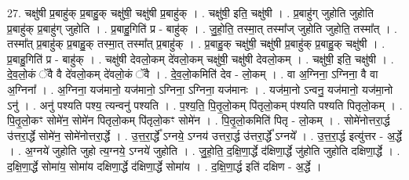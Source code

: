\documentclass[17pt]{extarticle}
\begin{document}
27. चक्षु॑षी प्र॒बाहु॑क् प्र॒बाहु॒क् चक्षु॑षी॒ चक्षु॑षी प्र॒बाहु॑क् । . चक्षु॑षी॒ इति॒ चक्षु॑षी । . प्र॒बाहु॑ग् जुहोति जुहोति प्र॒बाहु॑क् प्र॒बाहु॑ग् जुहोति । . प्र॒बाहु॒गिति॑ प्र - बाहु॑क् । . जु॒हो॒ति॒ तस्मा॒त् तस्मा᳚ज् जुहोति जुहोति॒ तस्मा᳚त् । . तस्मा᳚त् प्र॒बाहु॑क् प्र॒बाहु॒क् तस्मा॒त् तस्मा᳚त् प्र॒बाहु॑क् । . प्र॒बाहु॒क् चक्षु॑षी॒ चक्षु॑षी प्र॒बाहु॑क् प्र॒बाहु॒क् चक्षु॑षी । . प्र॒बाहु॒गिति॑ प्र - बाहु॑क् । . चक्षु॑षी देवलो॒कम् दे॑वलो॒कम् चक्षु॑षी॒ चक्षु॑षी देवलो॒कम् । . चक्षु॑षी॒ इति॒ चक्षु॑षी । . दे॒व॒लो॒कं ॅवै वै दे॑वलो॒कम् दे॑वलो॒कं ॅवै । . दे॒व॒लो॒कमिति॑ देव - लो॒कम् । . वा अ॒ग्निना॒ ऽग्निना॒ वै वा अ॒ग्निना᳚ । . अ॒ग्निना॒ यज॑मानो॒ यज॑मानो॒ ऽग्निना॒ ऽग्निना॒ यज॑मानः । . यज॑मा॒नो ऽन्वनु॒ यज॑मानो॒ यज॑मा॒नो ऽनु॑ । . अनु॑ पश्यति पश्य॒ त्यन्वनु॑ पश्यति । . प॒श्य॒ति॒ पि॒तृ॒लो॒कम् पि॑तृलो॒कम् प॑श्यति पश्यति पितृलो॒कम् । . पि॒तृ॒लो॒कꣳ सोमे॑न॒ सोमे॑न पितृलो॒कम् पि॑तृलो॒कꣳ सोमे॑न । . पि॒तृ॒लो॒कमिति॑ पितृ - लो॒कम् । . सोमे॑नोत्तरा॒र्द्ध उ॑त्तरा॒र्द्धे सोमे॑न॒ सोमे॑नोत्तरा॒र्द्धे । . उ॒त्त॒रा॒र्द्धे᳚ ऽग्नये॒ ऽग्नय॑ उत्तरा॒र्द्ध उ॑त्तरा॒र्द्धे᳚ ऽग्नये᳚ । . उ॒त्त॒रा॒र्द्ध इत्यु॑त्तर - अ॒र्द्धे । . अ॒ग्नये॑ जुहोति जुहो त्य॒ग्नये॒ ऽग्नये॑ जुहोति । . जु॒हो॒ति॒ द॒क्षि॒णा॒र्द्धे द॑क्षिणा॒र्द्धे जु॑होति जुहोति दक्षिणा॒र्द्धे । . द॒क्षि॒णा॒र्द्धे सोमा॑य॒ सोमा॑य दक्षिणा॒र्द्धे द॑क्षिणा॒र्द्धे सोमा॑य । . द॒क्षि॒णा॒र्द्ध इति॑ दक्षिण - अ॒र्द्धे । \newline
\end{document}
